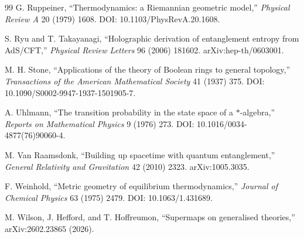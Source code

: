 \documentclass[11pt,letterpaper]{article}
\theoremstyle{definition}
\theoremstyle{remark}
\begin{document}
\begin{thebibliography}{99}
G. Ruppeiner,
``Thermodynamics: a Riemannian geometric model,''
\emph{Physical Review A} 20 (1979) 1608.
DOI: 10.1103/PhysRevA.20.1608.

S. Ryu and T. Takayanagi,
``Holographic derivation of entanglement entropy from AdS/CFT,''
\emph{Physical Review Letters} 96 (2006) 181602.
arXiv:hep-th/0603001.

M. H. Stone,
``Applications of the theory of Boolean rings to general topology,''
\emph{Transactions of the American Mathematical Society} 41 (1937) 375.
DOI: 10.1090/S0002-9947-1937-1501905-7.

A. Uhlmann,
``The transition probability in the state space of a $*$-algebra,''
\emph{Reports on Mathematical Physics} 9 (1976) 273.
DOI: 10.1016/0034-4877(76)90060-4.

M. Van Raamsdonk,
``Building up spacetime with quantum entanglement,''
\emph{General Relativity and Gravitation} 42 (2010) 2323.
arXiv:1005.3035.

F. Weinhold,
``Metric geometry of equilibrium thermodynamics,''
\emph{Journal of Chemical Physics} 63 (1975) 2479.
DOI: 10.1063/1.431689.

M. Wilson, J. Hefford, and T. Hoffreumon,
``Supermaps on generalised theories,''
arXiv:2602.23865 (2026).

\end{thebibliography}
\end{document}
